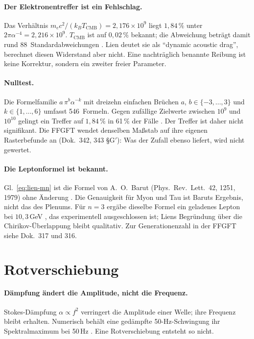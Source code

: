 \paragraph{Der Elektronentreffer ist ein Fehlschlag.}
Das Verhältnis $m_ec^2/(k_BT_\text{CMB})=2{,}176\times10^9$ liegt $1{,}84\,\%$
unter $2\pi\alpha^{-4}=2{,}216\times10^9$. $T_\text{CMB}$ ist auf $0{,}02\,\%$
bekannt; die Abweichung beträgt damit rund 88~Standardabweichungen \KM. Lien
deutet sie als \enquote{dynamic acoustic drag}, berechnet diesen Widerstand
aber nicht. Eine nachträglich benannte Reibung ist keine Korrektur, sondern
ein zweiter freier Parameter.

\paragraph{Nulltest.}
Die Formelfamilie $a\,\pi^b\alpha^{-k}$ mit dreizehn einfachen Brüchen $a$,
$b\in\{-3,\dots,3\}$ und $k\in\{1,\dots,6\}$ umfasst 546~Formeln. Gegen
zufällige Zielwerte zwischen $10^9$ und $10^{10}$ gelingt ein Treffer auf
$1{,}84\,\%$ in 61\,\% der Fälle \KM. Der Treffer ist daher nicht signifikant.
Die FFGFT wendet denselben Maßstab auf ihre eigenen Rasterbefunde an
(Dok.~342, 343 §G$'$): Was der Zufall ebenso liefert, wird nicht gewertet.

\paragraph{Die Leptonformel ist bekannt.}
Gl.~\eqref{eq:lien-mn} ist die Formel von A.~O.~Barut (Phys.\ Rev.\ Lett.\
42, 1251, 1979) ohne Änderung \BM. Die Genauigkeit für Myon und Tau ist
Baruts Ergebnis, nicht das des Plenums. Für $n=3$ ergäbe dieselbe Formel ein
geladenes Lepton bei $10{,}3$\,GeV \KM, das experimentell ausgeschlossen ist;
Liens Begründung über die Chirikov-Überlappung bleibt qualitativ. Zur
Generationenzahl in der FFGFT siehe Dok.~317 und 316.

\section{Rotverschiebung}

\paragraph{Dämpfung ändert die Amplitude, nicht die Frequenz.}
Stokes-Dämpfung $\alpha\propto f^2$ verringert die Amplitude einer Welle; ihre
Frequenz bleibt erhalten. Numerisch behält eine gedämpfte 50-Hz-Schwingung
ihr Spektralmaximum bei 50\,Hz \KM. Eine Rotverschiebung entsteht so nicht.

